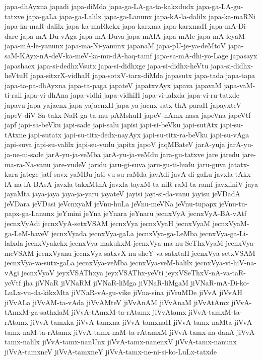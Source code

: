 {japa-dhAyxna
japadi
japa-diMda
japa-ga-LA-ga-ta-kakxdudx
japa-ga-LA-gu-tatxve
japa-gaLa
japa-ga-Lalilx
japa-ga-Lanunx
japa-kA-la-dalilx
japa-ka-maRNi
japa-ka-maR-dalilx
japa-ka-maRkekx
japa-karxma
japa-karxmaH
japa-mA-Di-dare
japa-mA-Du-vAga
japa-mA-Duva
japa-mAlA
japa-mAle
japa-mA-leyaM
japa-mA-le-yanunx
japa-ma-Ni-yanunx
japanaM
japa-pU-je-ya-deMtoV
japa-saM-KAyx-nA-deV-ka-meV-ka-mu-dA-haq-tamf
japa-sa-mA-dhi-yo-Lage
japasayx
japashacx
japa-si-dedhxVsutx
japa-si-didhxge
japa-si-didhx-heVtu
japa-si-didhx-heVtuH
japa-sitxrX-vidhaH
japa-sotxV-tarx-diMda
japasutx
japa-tada
japa-tapa
japa-ta-pa-dhAyxna
japa-ta-paga
japateV
japatxvAyx
japava
japavaM
japa-vaM-ti-rali
japa-vi-dhAna
japa-vidhi
japa-vidhiH
japa-vi-lalxda
japa-vi-ru-tatxde
japavu
japa-yajacnx
japa-yajacnxH
japa-ya-jacnx-satx-thA-paraH
japayxteV
japeV-diV-Sa-takx-NaR-ga-ta-mu-pAMshuH
japeV-nAmx-nasa
japeVna
japeVtf
japf
japi-sa-beVku
japi-sade
japi-salu
japisi
japi-si-beVku
japi-sutAtx
japi-su-tAtxne
japi-sutatx
japi-su-titx-dedx-nayAyx
japi-su-titx-ra-beVku
japi-su-vAga
japi-suva
japi-su-valilx
japi-su-vudu
japitx
japoV
jaqMBateV
jarA-yuja
jarA-yu-ja-ne-ni-sade
jarA-yu-ja-veMba
jarA-yu-ja-veMdu
jara-gu-tatxve
jare
jaredu
jare-ma-ra-Na-vanu
jare-vudeV
jaridu
jaru-gi-suva
jaru-gu-ti-hudu
jaru-guva
jatatx-kara
jatege
jatf-savx-yaMBu
jati-vu-su-raMda
javAdi
javA-di-gaLu
javxla-tAkx-lA-na-lA-BAsA
javxla-takxMthA
javxla-tayxM-ta-niR-raM-ta-ramf
javxliniV
jaya
jayaMta
jaya-jaya
jaya-ja-yaru
jayateV
jayisi
jayi-si-da-vanu
jayisu
jeVDadA
jeVDara
jeVDasi
jeVcnxyaM
jeVnu-huLa
jeVnu-meVNa
jeVnu-tupapx
jeVnu-tu-papx-ga-Lanunx
jeYmini
jeYna
jeYnara
jeYnaru
jecnxVyA
jecnxVyA-BA-vAtf
jecnxVyAdi
jecnxVyA-setxVSAM
jecnxVya
jecnxVyaH
jecnxVyaM
jecnxVyaM-ga-LeM-baveV
jecnxVyada
jecnxVya-gaLa
jecnxVya-ga-LeMba
jecnxVya-ga-Li-lalxda
jecnxVyakekx
jecnxVya-makukxM
jecnxVya-ma-nu-SeThxVyaM
jecnxVya-meVSAM
jecnxVyanu
jecnxVya-satxvX-nu-sheY-va-satxtaH
jecnxVya-setxVSAM
jecnxVya-va-sutx-gaLa
jecnxVya-veMba
jecnxVya-veM-balilx
jecnxVya-vi-hiV-na-vAgi
jecnxVyoV
jeyxVSAThxya
jeyxVSAThx-yeVti
jeyxVSeThxV-nA-va-taR-yeVtf
jha
jiVNaR
jiVNaRM
jiVNaR-liMga
jiVNaR-liMgaM
jiVNaR-mA-Di-ko-LuLx-vu-da-kikxMta
jiVNaR-vA-gu-vike
jiVna-sina
jiVruMDe
jiVvA
jiVvAH
jiVvALa
jiVvAM-ta-vAda
jiVvAMteV
jiVvAnAM
jiVvAnaM
jiVvAtAmx
jiVvA-tAmxM-ga-sathxlaM
jiVvA-tAmxM-ta-rAtamx
jiVvAtamx
jiVvA-tamxM-ta-rAtamx
jiVvA-tamxka
jiVvA-tamxna
jiVvA-tamxnaH
jiVvA-tamx-naMta
jiVvA-tamx-naM-ta-rAtamx
jiVvA-tamx-naM-ta-rAtamxM
jiVvA-tamx-na-danA
jiVvA-tamx-nalilx
jiVvA-tamx-nanUnx
jiVvA-tamx-nanenxV
jiVvA-tamx-nanunx
jiVvA-tamxneV
jiVvA-tamxneY
jiVvA-tamx-ne-ni-si-ko-LuLx-tatxde
}
